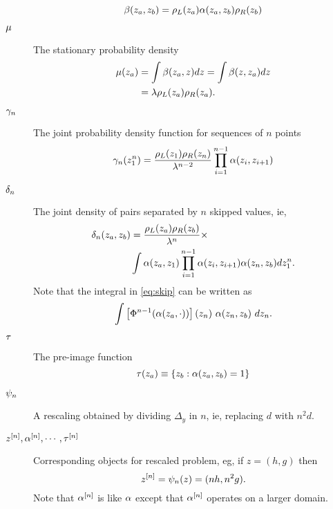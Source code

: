 \documentclass[twocolumn]{article}
\newcommand{\set}[1]{\left\{ #1 \right\}}
\begin{document}
\begin{description}
\begin{equation}
    \label{eq:pairdef}
    \beta(z_a,z_b) = \rho_L(z_a) \alpha(z_a,z_b) \rho_R(z_b)
  \end{equation}
\item[$\mu$] The stationary probability density
  \begin{align}
    \mu(z_a) &= \int \beta(z_a,z) dz = \int \beta(z,z_a) dz
                       \nonumber \\
    \label{eq:stationary}
                     &= \lambda \rho_L(z_a) \rho_R(z_a).
  \end{align}
\item[$\gamma_{n}$] The joint probability density function for
  sequences of $n$ points
  \begin{equation}
    \label{eq:ptuple}
    \gamma_{n}(z_{1}^{n}) = \frac{\rho_L(z_1)
      \rho_R(z_n)}{\lambda^{n-2}} \prod_{i=1}^{n-1} \alpha(z_i,z_{i+1})
  \end{equation}
\item[$\delta_{n}$] The joint density of pairs separated by $n$ skipped
  values, ie,
  \begin{align}
    \label{eq:skip}
    \delta_{n}(z_a,z_b) &= \frac{\rho_L(z_a) \rho_R(z_b)}{\lambda^n}
                        \times \nonumber \\
                      & \int \alpha(z_a,z_1) \prod_{i=1}^{n-1}
                        \alpha(z_i,z_{i+1}) \alpha(z_n,z_b) d
                        z_{1}^{n}.
  \end{align}
  Note that the integral in \eqref{eq:skip} can be written as
  \begin{equation*}
    \int \left[ \Phi^{n-1}(\alpha(z_a,\cdot)) \right] (z_n)~
    \alpha(z_n,z_b)~ dz_n.
  \end{equation*}
\item[$\tau$] The pre-image function
  \begin{equation*}
    \preimage(z_a) \equiv \set{z_b: \allowed(z_a,z_b) = 1}
  \end{equation*}
\item[$\psi_{n}$] A rescaling obtained by dividing $\Delta_y$ in $n$,
  ie, replacing $d$ with $n^2d$.
\item[$z^{[n]}, \alpha^{[n]},\cdots, \tau^{[n]}$] Corresponding objects for
  rescaled problem, eg, if $z=(h,g)$ then
  \begin{equation*}
    z^{[n]} = \psi_{n}(z) = (nh, n^2g).
  \end{equation*}
  Note that $\alpha^{[n]}$ is like $\alpha$ except that
  $\alpha^{[n]}$ operates on a larger domain.
\end{description}
\end{document}
